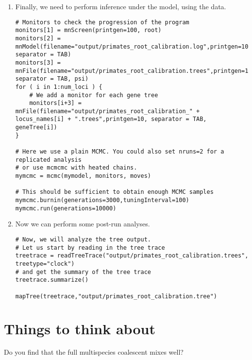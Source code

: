 \begin{enumerate}
\item Finally, we need to perform inference under the model, using the data.
{\tt \begin{snugshade*}
\begin{lstlisting}
# Monitors to check the progression of the program
monitors[1] = mnScreen(printgen=100, root)
monitors[2] = mnModel(filename="output/primates_root_calibration.log",printgen=10, separator = TAB)
monitors[3] = mnFile(filename="output/primates_root_calibration.trees",printgen=10, separator = TAB, psi)
for ( i in 1:num_loci ) { 
    # We add a monitor for each gene tree
    monitors[i+3] = mnFile(filename="output/primates_root_calibration_" + locus_names[i] + ".trees",printgen=10, separator = TAB, geneTree[i])
}

# Here we use a plain MCMC. You could also set nruns=2 for a replicated analysis
# or use mcmcmc with heated chains.
mymcmc = mcmc(mymodel, monitors, moves)

# This should be sufficient to obtain enough MCMC samples
mymcmc.burnin(generations=3000,tuningInterval=100)
mymcmc.run(generations=10000)
\end{lstlisting}
\end{snugshade*}}

\item Now we can perform some post-run analyses.
{\tt \begin{snugshade*}
\begin{lstlisting}
# Now, we will analyze the tree output.
# Let us start by reading in the tree trace
treetrace = readTreeTrace("output/primates_root_calibration.trees", treetype="clock")
# and get the summary of the tree trace
treetrace.summarize()

mapTree(treetrace,"output/primates_root_calibration.tree")
\end{lstlisting}
\end{snugshade*}}

\end{enumerate}



\section{Things to think about}
Do you find that the full multispecies coalescent mixes well?





